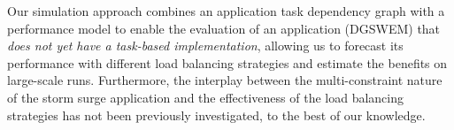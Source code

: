 Our simulation approach combines an application task dependency graph with a performance model to enable the evaluation of an application (DGSWEM) that {\em does not yet have a task-based implementation}, allowing us to forecast its performance with different load balancing strategies and estimate the benefits on large-scale runs.
Furthermore, the interplay between the multi-constraint nature of the storm surge application and the effectiveness of the load balancing strategies has not been previously investigated, to the best of our knowledge.
